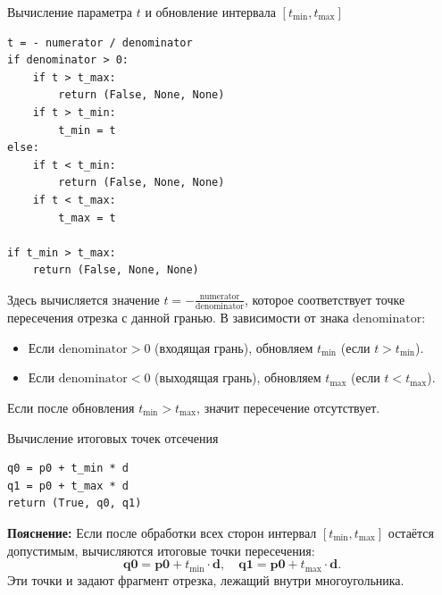 \documentclass[areasetadvanced]{scrartcl}
\begin{document}
Вычисление параметра \(t\) и обновление интервала \([t_{\min}, t_{\max}]\)
\begin{lstlisting}
t = - numerator / denominator
if denominator > 0:   
    if t > t_max:
        return (False, None, None)
    if t > t_min:
        t_min = t
else:               
    if t < t_min:
        return (False, None, None)
    if t < t_max:
        t_max = t

if t_min > t_max:
    return (False, None, None)
\end{lstlisting}
Здесь вычисляется значение \(t = -\frac{\text{numerator}}{\text{denominator}}\), которое соответствует точке пересечения отрезка с данной гранью. В зависимости от знака \(\text{denominator}\):
\begin{itemize}
    \item Если \(\text{denominator} > 0\) (входящая грань), обновляем \(t_{\min}\) (если \(t > t_{\min}\)).
    \item Если \(\text{denominator} < 0\) (выходящая грань), обновляем \(t_{\max}\) (если \(t < t_{\max}\)).
\end{itemize}
Если после обновления \(t_{\min} > t_{\max}\), значит пересечение отсутствует.

Вычисление итоговых точек отсечения
\begin{lstlisting}
q0 = p0 + t_min * d
q1 = p0 + t_max * d
return (True, q0, q1)
\end{lstlisting}
\textbf{Пояснение:}  
Если после обработки всех сторон интервал \([t_{\min}, t_{\max}]\) остаётся допустимым, вычисляются итоговые точки пересечения:
\[
\mathbf{q0} = \mathbf{p0} + t_{\min} \cdot \mathbf{d}, \quad \mathbf{q1} = \mathbf{p0} + t_{\max} \cdot \mathbf{d}.
\]
Эти точки и задают фрагмент отрезка, лежащий внутри многоугольника.
\newpage
\end{document}
